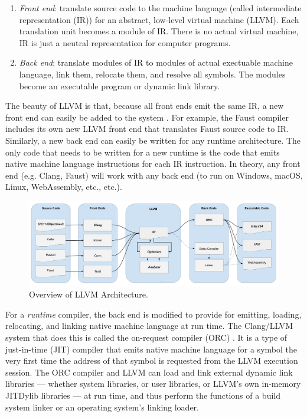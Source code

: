 \documentclass[letterpaper, 12pt]{article}
\begin{document}
\begin{enumerate}
\item \textit{Front end}: translate source code to the machine language (called intermediate representation (IR)) for an abstract, low-level virtual machine (LLVM). Each translation unit becomes a module of IR. There is no actual virtual machine, IR is just a neutral representation for computer programs.
\item \textit{Back end}: translate modules of IR to modules of actual exectuable machine language, link them, relocate them, and resolve all symbols. The modules become an executable program or dynamic link library.
\end{enumerate}

\noindent The beauty of LLVM is that, because all front ends emit the same IR, a new front end can easily be added to the system . For example, the Faust compiler \citep{faust} includes its own new LLVM front end that translates Faust source code to IR. Similarly, a new back end can easily be written for any runtime architecture. The only code that needs to be written for a new runtime is the code that emits native machine language instructions for each IR instruction. In theory, any front end (e.g. Clang, Faust) will work with any back end (to run on Windows, macOS, Linux, WebAssembly, etc., etc.).

\begin{figure}[]
\begin{center}
\includegraphics[width=\textwidth,height=\textheight,keepaspectratio]{CLangLLVMArchitecture}\caption{Overview of LLVM Architecture.}
\label{fig:llvm}
\end{center}
\end{figure}

For a \textit{runtime} compiler, the back end is modified to provide for emitting, loading, relocating, and linking native machine language at run time. The Clang/LLVM system that does this is called the on-request compiler (ORC) \citep{llvmorc}. It is a type of just-in-time (JIT) compiler that emits native machine language for a symbol the very first time the address of that symbol is requested from the LLVM execution session. The ORC compiler and LLVM can load and link external dynamic link libraries --- whether system libraries, or user libraries, or LLVM's own in-memory JITDylib libraries --- at run time, and thus perform the functions of a build system linker or an operating system's linking loader. 
\end{document}
